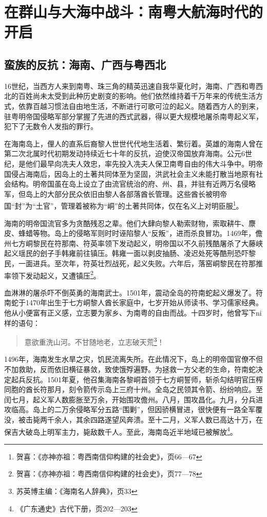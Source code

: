 \chapter{在群山与大海中战斗：南粤大航海时代的开启}

\section{蛮族的反抗：海南、广西与粤西北}

16世纪，当西方人来到南粤、珠三角的精英迅速自我华夏化时，海南、广西和粤西北的百姓尚未太受到此种历史剧变的影响。他们依然维持着千万年来的传统生活方式，依靠百越习惯法自由地生活，不断进行可歌可泣的起义。随着西方人的到来，驻粤明帝国侵略军部分掌握了先进的西式武器，得以更大规模地屠杀南粤起义军，犯下了无数令人发指的罪行。

在海南岛上，俚人的直系后裔黎人世世代代地生活着、繁衍着。英雄的海南人曾在第二次北属时代初期发动持续近七十年的反抗，迫使汉帝国放弃海南。公元6世纪，是他们最早向冼夫人效忠，率先投入冼夫人保卫南粤自由的伟大斗争中。明帝国侵占海南后，因岛上的土著共同体至为坚固，洪武社会主义未能打散当地原有社会结构。明帝国虽在岛上设立了由流官统治的府、州、县，并驻有近两万名侵略军，但岛上的大部分民众依旧由黎人各部落酋长管理。这些酋长被明帝国“封”为“土官”，管理着被称为“峒”的土著共同体，仅在名义上对明臣服\footnote{贺喜：《亦神亦祖：粤西南信仰构建的社会史》，页66—67}。

海南的明帝国流官多为贪酷残忍之辈。他们大肆向黎人勒索财物，索取耕牛、麖皮、蜂蜡等物。岛上的侵略军则时时诬陷黎人“反叛”，进而杀良冒功。1469年，儋州七方峒黎民在符那南、符英率领下发动起义，明帝国以不久前残酷屠杀了大藤峡起义瑶民的刽子手韩雍前往镇压。韩雍一面以剥皮抽肠、凌迟处死等酷刑恐吓黎民，一面进兵。至次年，符英壮烈战死，起义失败。六年后，落窑峒黎民在符那推率领下发动起义，又遭镇压\footnote{贺喜：《亦神亦祖：粤西南信仰构建的社会史》，页77—78}。

血淋淋的屠杀吓不倒英勇的海南武士。1501年，震动全岛的符南蛇起义爆发了。符南蛇于1470年出生于七方峒黎人酋长家庭中，七岁开始从师读书、学习儒家经典。他从小便富有正义感，立志要为家乡、为南粤的自由而战。十四岁时，他曾写下ni 样的语句：

\begin{quote}

意欲重洗山河。不甘随地老，立志破天荒\footnote{苏英博主编：《海南名人辞典》，页33}！

\end{quote}

1496年，海南发生水旱之灾，饥民流离失所。在此情况下，岛上的明帝国官僚不但不加救助，反而依旧横征暴敛，致使饿殍遍野。为拯救一方父老的生命，符南蛇决定起兵反抗。1501年夏，他召集海南各黎峒首领于七方峒誓师，斩杀勾结明官压榨同胞的酋长符那月，刻令箭传示岛上三府十州。全岛之民领其令箭、纷纷响应。至闰七月，起义军人数膨胀至万余，开始围攻儋州。八月，围攻昌化。九月，分兵进攻临高。岛上的二万余侵略军分五路“围剿”，但因骄横冒进，很快便有一路全军覆没，被击毙两千余人，其余四路遂望风奔溃。至十二月，义军人数已高达十万，在保吉大破岛上明军主力，毙敌数千人。至此，海南岛近半地域已被解放\footnote{《广东通史》古代下册，页202—203}。

